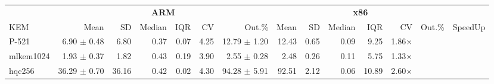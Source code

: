 \begin{table}[!ht]
\centering
\begin{tabular}{l|rrrrrr|rrrrrr|r}
\toprule
& \multicolumn{6}{c}{\bfseries ARM} & \multicolumn{6}{c}{\bfseries x86} & \\
\cmidrule(lr){2-7} \cmidrule(lr){8-13}
KEM & Mean & SD & Median & IQR & CV & Out.\% & Mean & SD & Median & IQR & CV & Out.\% & SpeedUp \\
\midrule
P-521 		& 6.90 $\pm$  0.48 & 6.80 & 0.37 & 0.07 & 4.25  & 12.79 $\pm$ 1.20 & 12.43 & 0.65 & 0.09 & 9.25 & 1.86× \\
mlkem1024 	& 1.93 $\pm$  0.37 & 1.82 & 0.43 & 0.19 & 3.90  & 2.55  $\pm$ 0.28 & 2.48 & 0.26 & 0.11 & 5.75 & 1.33× \\
hqc256 		& 36.29 $\pm$ 0.70 & 36.16 & 0.42 & 0.02 & 4.30 & 94.28 $\pm$ 5.91 & 92.51 & 2.12 & 0.06 & 10.89 & 2.60× \\

\bottomrule
\end{tabular}
\end{table}
